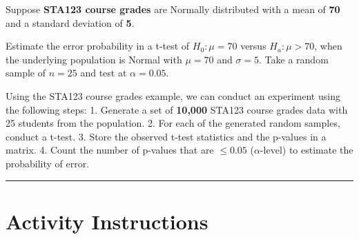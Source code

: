 \documentclass[oneside,openany]{book}
\begin{document}
Suppose \textbf{STA123 course grades} are Normally distributed with a mean of \textbf{70} and a standard deviation of \textbf{5}.

Estimate the error probability in a t-test of \(H_0: \mu = 70\) versus \(H_a: \mu > 70\), when the underlying population is Normal with \(\mu = 70\) and \(\sigma = 5\). Take a random sample of \(n = 25\) and test at \(\alpha = 0.05\).

Using the STA123 course grades example, we can conduct an experiment using the following steps:
1. Generate a set of \textbf{10,000} STA123 course grades data with 25 students from the population.
2. For each of the generated random samples, conduct a t-test.
3. Store the observed t-test statistics and the p-values in a matrix.
4. Count the number of p-values that are \(\leq 0.05\) (\(\alpha\)-level) to estimate the probability of error.

\begin{center}\rule{0.5\linewidth}{0.5pt}\end{center}

\section{Activity Instructions}\label{activity-instructions}
\end{document}
